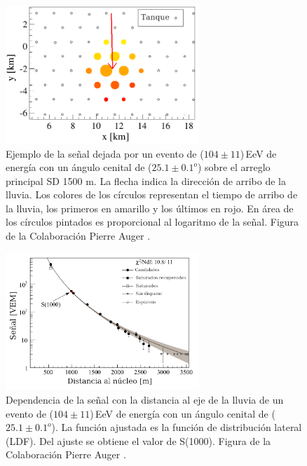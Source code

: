 \begin{figure}[H]
	\begin{small}
		\begin{center}
			\includegraphics[width=0.65\textwidth]{evento_sd.png}
		\end{center}
		\caption{Ejemplo de la señal dejada por un evento de ($104\pm11$)\,EeV de energía con un ángulo cenital de ($25.1\pm0.1 ^o$) sobre el arreglo principal SD 1500 m. La flecha indica la dirección de arribo de la lluvia. Los colores de los círculos representan el tiempo de arribo de la lluvia, los primeros en amarillo y los últimos en rojo. En área de los círculos pintados es proporcional al logaritmo de la señal. Figura de la Colaboración Pierre Auger \cite{como_funciona_auger}. } 	\label{fig:evento_sd}
	\end{small}
\end{figure}
\begin{figure}[H]
	\begin{small}
		\begin{center}
			\includegraphics[width=0.65\textwidth]{evento_s1000.png}
		\end{center}
		\caption{Dependencia de la señal con la distancia al  eje de la lluvia de un evento de ($104\pm11$)\,EeV de energía con un ángulo cenital de ($25.1\pm0.1 ^o$). La función ajustada es la función de distribución lateral (LDF). Del ajuste se obtiene el valor de S(1000). Figura de la Colaboración Pierre Auger \cite{como_funciona_auger}. } 	\label{fig:evento_S1000}
	\end{small}
\end{figure}

